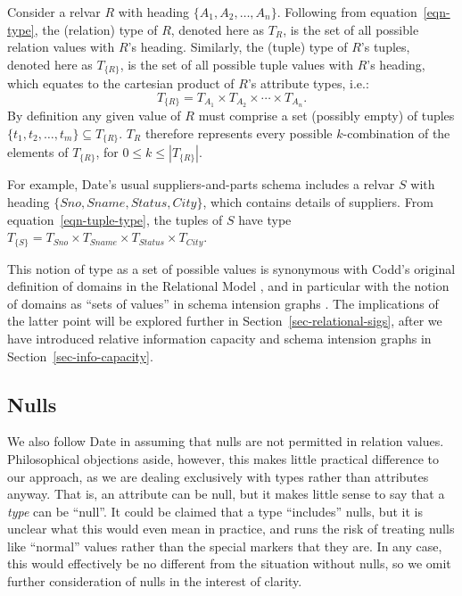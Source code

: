 \documentclass{sig-alternate-05-2015}
\newcommand{\Sno}{\ensuremath{\mathit{Sno}}}
\newcommand{\Sname}{\ensuremath{\mathit{Sname}}}
\newcommand{\Status}{\ensuremath{\mathit{Status}}}
\newcommand{\City}{\ensuremath{\mathit{City}}}
\newcommand{\T}[1]{\ensuremath{T_{#1}}}
\newcommand{\TT}[1]{\ensuremath{T_{\{#1\}}}}
\newcommand{\TSSC}{\ensuremath{\T{\Sname} \times \T{\Status} \times \T{\City}}}
\begin{document}
Consider a relvar \(R\) with heading \(\{A_{1}, A_{2}, \dotsc, A_{n}\}\). Following from equation~\ref{eqn-type}, the (relation) type of \(R\), denoted here as \(\T{R}\), is the set of all possible relation values with \(R\)'s heading. Similarly, the (tuple) type of \(R\)'s tuples, denoted here as \TT{R}, is the set of all possible tuple values with \(R\)'s heading, which equates to the cartesian product of \(R\)'s attribute types, i.e.:
\begin{equation}\label{eqn-tuple-type}
\TT{R} = \T{A_{1}} \times \T{A_{2}} \times\dotsb\times \T{A_{n}}\text{.}
\end{equation}
By definition any given value of \(R\) must comprise a set (possibly empty) of tuples \(\{t_{1}, t_{2}, \dotsc, t_{m}\} \subseteq \TT{R}\). \(\T{R}\) therefore represents every possible \(k\)-combination of the elements of \TT{R}, for \(0 \le k \le \left|\TT{R}\right|\).

For example, Date's usual suppliers-and-parts schema \cite{Date.C-2013a-View} includes a relvar \(S\) with heading \(\{\Sno, \Sname, \Status, \City\}\), which contains details of suppliers. From equation~\ref{eqn-tuple-type}, the tuples of \(S\) have type \(\TT{S} = \T{\Sno} \times \TSSC\).

This notion of type as a set of possible values is synonymous with Codd's original definition of domains in the Relational Model \cite{Codd.E-1970a-Relational,Date.C-2012a-SQL-and-Relational}, and in particular with the notion of domains as ``sets of values'' in schema intension graphs \cite{Miller.R-1994a-Schema,Miller.R-1994a-SIG}. The implications of the latter point will be explored further in Section~\ref{sec-relational-sigs}, after we have introduced relative information capacity and schema intension graphs in Section~\ref{sec-info-capacity}.




\subsection{Nulls}

\noindent We also follow Date in assuming that nulls are not permitted in relation values. Philosophical objections aside, however, this makes little practical difference to our approach, as we are dealing exclusively with types rather than attributes anyway. That is, an attribute can be null, but it makes little sense to say that a \emph{type} can be ``null''. It could be claimed that a type ``includes'' nulls, but it is unclear what this would even mean in practice, and runs the risk of treating nulls like ``normal'' values rather than the special markers that they are. In any case, this would effectively be no different from the situation without nulls, so we omit further consideration of nulls in the interest of clarity.
\end{document}
